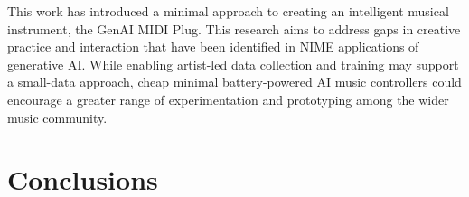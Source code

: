 \documentclass[manuscript,review,anonymous]{acmart}
\begin{document}
This work has introduced a minimal approach to creating an intelligent musical instrument, the GenAI MIDI Plug. This research aims to address gaps in creative practice and interaction that have been identified in NIME applications of generative AI. While enabling artist-led data collection and training may support a small-data approach, cheap minimal battery-powered AI music controllers could encourage a greater range of experimentation and prototyping among the wider music community.

\section{Conclusions}\label{concl}



 
\end{document}
